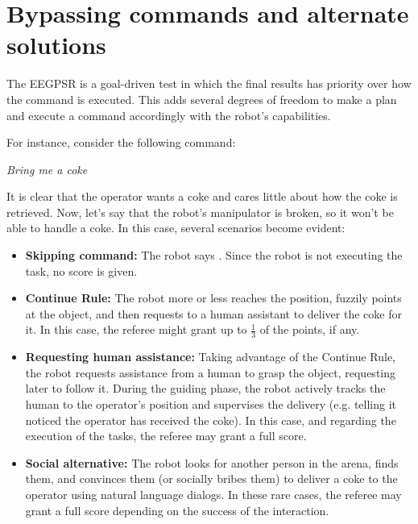\section{Bypassing commands and alternate solutions}
The EEGPSR is a goal-driven test in which the final results has priority over how the command is executed.
This adds several degrees of freedom to make a plan and execute a command accordingly with the robot's capabilities.

For instance, consider the following command:

\begin{center}
\noindent\textit{Bring me a coke}
\end{center}

It is clear that the operator wants a coke and cares little about how the coke is retrieved. Now, let's say that the robot's manipulator is broken, so it won't be able to handle a coke. In this case, several scenarios become evident:

\begin{itemize}
	\item \textbf{Skipping command:} The robot says . Since the robot is not executing the task, no score is given.

	\item \textbf{Continue Rule:} The robot more or less reaches the position, fuzzily points at the object, and then requests to a human assistant to deliver the coke for it. In this case, the referee might grant up to $\frac{1}{3}$ of the points, if any.

	\item \textbf{Requesting human assistance:} Taking advantage of the Continue Rule, the robot requests assistance from a human to grasp the object, requesting later to follow it. During the guiding phase, the robot actively tracks the human to the operator's position and supervises the delivery (e.g. telling it noticed the operator has received the coke). In this case, and regarding the execution of the tasks, the referee may grant a full score.

	\item \textbf{Social alternative:} The robot looks for another person in the arena, finds them, and convinces them (or socially bribes them) to deliver a coke to the operator using natural language dialogs. In these rare cases, the referee may grant a full score depending on the success of the interaction.
\end{itemize}


